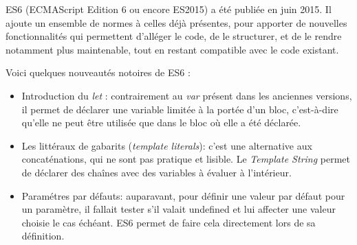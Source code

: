 \bigskip

ES6 (ECMAScript Edition 6 ou encore ES2015) a été publiée en juin 2015.
Il ajoute un ensemble de normes à celles déjà présentes, pour apporter
de nouvelles fonctionnalités qui permettent d'alléger le code, de le
structurer, et de le rendre notamment plus maintenable, tout en restant
compatible avec le code existant.

\bigskip

Voici quelques nouveautés notoires de ES6 :

\begin{itemize}
\item
  Introduction du \emph{let} : contrairement au \emph{var} présent dans
  les anciennes versions, il permet de déclarer une variable limitée à
  la portée d'un bloc, c'est-à-dire qu'elle ne peut être utilisée que
  dans le bloc où elle a été déclarée.
\item
  Les littéraux de gabarits (\emph{template literals}): c'est une
  alternative aux concaténations, qui ne sont pas pratique et lisible.
  Le \emph{Template String} permet de déclarer des chaînes avec des
  variables à évaluer à l'intérieur.

\begin{Shaded}
\begin{Highlighting}[]
 \OperatorTok{=} 
 \OperatorTok{=} \SpecialCharTok{$\{}\SpecialCharTok{\}}
 \OperatorTok{=} \OperatorTok{;}
 \OperatorTok{=}  \OperatorTok{+} \OperatorTok{;}
\end{Highlighting}
\end{Shaded}
\item
  Paramétres par défauts: auparavant, pour définir une valeur par défaut
  pour un paramètre, il fallait tester s'il valait undefined et lui
  affecter une valeur choisie le cas échéant. ES6 permet de faire cela
  directement lors de sa définition.


\end{itemize}
